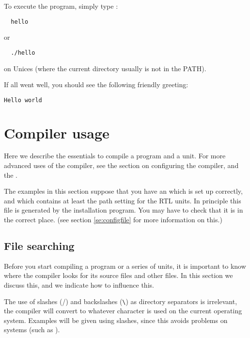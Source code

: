 To execute the program, simply type :
\begin{verbatim}
  hello
\end{verbatim}
or
\begin{verbatim}
  ./hello
\end{verbatim}
on Unices (where the current directory usually is not in the PATH). 

If all went well, you should see the following friendly greeting:
\begin{verbatim}
Hello world
\end{verbatim}

\chapter{Compiler usage}
\label{ch:Usage}

Here we describe the essentials to compile a program and a unit.
For more advanced uses of the compiler, see the section on configuring 
the compiler, and the \progref{}.

The examples in this section suppose that you have an  which
is set up correctly, and which contains at least the path setting for the
RTL units. In principle this file is generated by the installation program.
You may have to check that it is in the correct place. (see section
\ref{se:configfile} for more information on this.)

\section{File searching}
Before you start compiling a program or a series of units, it is
important to know where the compiler looks for its source files and other
files. In this section we discuss this, and we indicate how to influence
this.

\begin{remark}
The use of slashes (/) and backslashes (\verb+\+) as directory separators
is irrelevant, the compiler will convert to whatever character is used on
the current operating system. Examples will be given using slashes, since
this avoids problems on \unix systems (such as \linux).
\end{remark}

